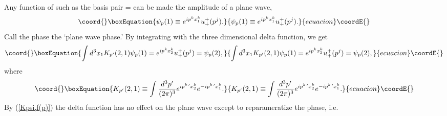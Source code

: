 \documentclass[a4paper,12pt]{article}
\begin{document}
	Any function of \coordHE{} such as the basis pair \coordHE{} = \coordHE{} can be made the amplitude of a plane wave,
\begin{equation}\coord{}\boxEquation{	\label{psi,f(p)}
\psi_{p}(1) \equiv e^{ip^{k} x_{1}^{k}} u_{+}^{+}(p^{j}).
}{	\psi_{p}(1) \equiv e^{ip^{k} x_{1}^{k}} u_{+}^{+}(p^{j}).
}{ecuacion}\coordE{}\end{equation}
Call the phase \coordHE{} the `plane wave phase.' By integrating with the three dimensional delta function, we get
\begin{equation}\coord{}\boxEquation{	\label{Kpsi,f(p)}
  \int d^{3} x_{1} K_{p^{\prime}}(2,1) \psi_{p}(1) =  e^{ip^{k} x_{2}^{k}} u_{+}^{+}(p^{j}) = \psi_{p}(2),
}{	\int d^{3} x_{1} K_{p^{\prime}}(2,1) \psi_{p}(1) =  e^{ip^{k} x_{2}^{k}} u_{+}^{+}(p^{j}) = \psi_{p}(2),
}{ecuacion}\coordE{}\end{equation}
where 
\begin{equation}\coord{}\boxEquation{	\label{K,f(p)}
K_{p^{\prime}}(2,1) \equiv \int \frac{d^3 p^{ \prime} }{(2 \pi)^3} e^{i p^{k \, \prime} x_{2}^{k}} e^{- i p^{k \, \prime} x_{1}^{k}}.
}{	K_{p^{\prime}}(2,1) \equiv \int \frac{d^3 p^{ \prime} }{(2 \pi)^3} e^{i p^{k \, \prime} x_{2}^{k}} e^{- i p^{k \, \prime} x_{1}^{k}}.
}{ecuacion}\coordE{}\end{equation} 
By (\ref{Kpsi,f(p)}) the delta function has no effect on the plane wave except to reparameratize the phase, i.e. \coordHE{}  \coordHE{}
\end{document}
